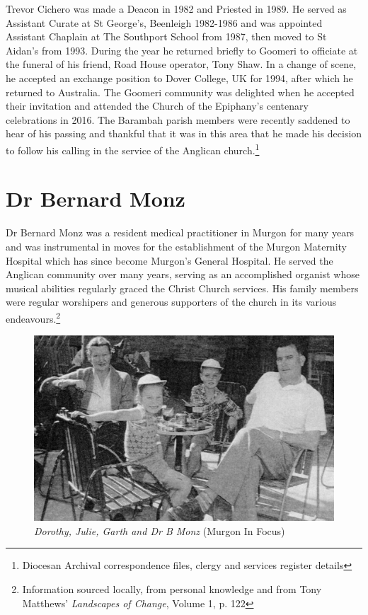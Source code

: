 \balance


Trevor Cichero was made a Deacon in 1982 and Priested in 1989. He served as Assistant Curate at St George's, Beenleigh 1982-1986 and was appointed Assistant Chaplain at The Southport School from 1987, then moved to St Aidan's from 1993. During the year he returned briefly to Goomeri to officiate at the funeral of his friend, Road House operator, Tony Shaw. In a change of scene, he accepted an exchange position to Dover College, UK for 1994, after which he returned to Australia. The Goomeri community was delighted when he accepted their invitation and attended the Church of the Epiphany's centenary celebrations in 2016. The Barambah parish members were recently saddened to hear of his passing and thankful that it was in this area that he made his decision to follow his calling in the service of the Anglican church.\footnote{Diocesan Archival correspondence files, clergy and services register details}


\section{Dr Bernard Monz}



Dr Bernard Monz was a resident medical practitioner in Murgon for many years and was instrumental in moves for the establishment of the Murgon Maternity Hospital which has since become Murgon's General Hospital. He served the Anglican community over many years, serving as an accomplished organist whose musical abilities regularly graced the Christ Church services. His family members were regular worshipers and generous supporters of the church in its various endeavours.\footnote{Information sourced locally, from personal knowledge and from Tony Matthews' \emph{Landscapes of Change}, Volume 1, p. 122}








\begin{figure}
\begin{center}
\includegraphics[width=1.\linewidth,center]{../images/monz.jpg}
\caption{{\itshape Dorothy, Julie, Garth and Dr B Monz} {\scriptsize(Murgon In Focus)}}
\end{center}
\end{figure}




